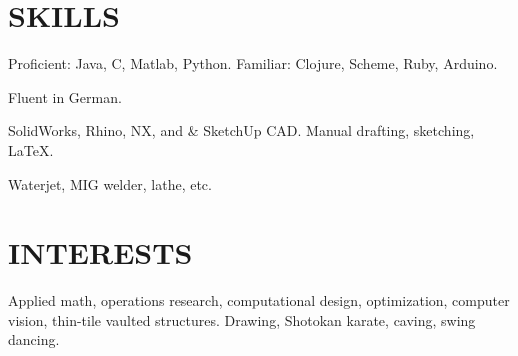 \documentclass[margin]{res}
\begin{document}
\begin{resume}
\section{SKILLS} 
\begin{description} \itemsep -2pt
    \item[Programming:] Proficient: Java, C, Matlab, Python. Familiar: Clojure, Scheme, Ruby, Arduino.
    \item[Linguistic:] Fluent in German.
    \item[Design:] SolidWorks, Rhino, NX, and \& SketchUp CAD. Manual drafting, sketching, \LaTeX.
    \item[Machine Shop:] Waterjet, MIG welder, lathe, etc.
\end{description}


\section{INTERESTS}
Applied math, operations research, computational design, optimization, computer vision, thin-tile vaulted structures. Drawing, Shotokan karate, caving, swing dancing.
\end{resume}
\end{document}
